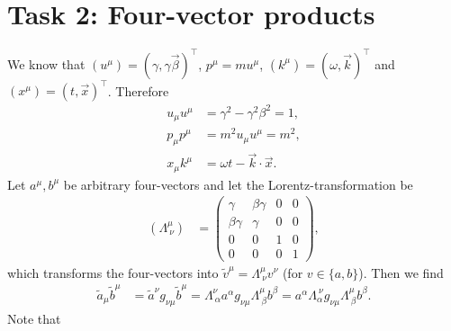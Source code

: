 \documentclass[english, parskip=full]{scrartcl}
\begin{document}
\section*{Task 2: Four-vector products}
We know that $(u^\mu) = (\gamma,\gamma\vec{\beta})^\top$,  $p^\mu = mu^\mu$, $(k^\mu) = (\omega, \vec{k})^\top$ and $(x^\mu) = (t,\vec{x})^\top$.
Therefore
\begin{align}
u_\mu u^\mu &= \gamma^2 - \gamma^2\beta^2 = 1,\\
p_\mu p^\mu &= m^2 u_\mu u^\mu = m^2,\\
x_\mu k^\mu &= \omega t - \vec{k}\cdot\vec{x}.
\end{align}
Let $a^\mu,b^\mu$ be arbitrary four-vectors and let the Lorentz-transformation be
\begin{align}
(\Lambda^\mu_{\ \nu}) &= \begin{pmatrix}
\gamma & \beta\gamma & 0 & 0 \\
\beta\gamma & \gamma & 0 & 0 \\
0 & 0 & 1 & 0 \\
0 & 0 & 0 & 1
\end{pmatrix},
\end{align}
which transforms the four-vectors into $\tilde{v}^\mu = \Lambda^\mu_{\ \nu} v^\nu$ (for $v\in\{a,b\}$).
Then we find
\begin{align}
\tilde{a}_\mu \tilde{b}^\mu &= \tilde{a}^\nu g_{\nu\mu} \tilde{b}^\mu = \Lambda^\nu_{\ \alpha}a^\alpha g_{\nu\mu} \Lambda^\mu_{\ \beta} b^\beta = a^\alpha \Lambda_{\alpha}^{\ \nu} g_{\nu\mu} \Lambda^\mu_{\ \beta} b^\beta.
\end{align}
Note that
\end{document}
